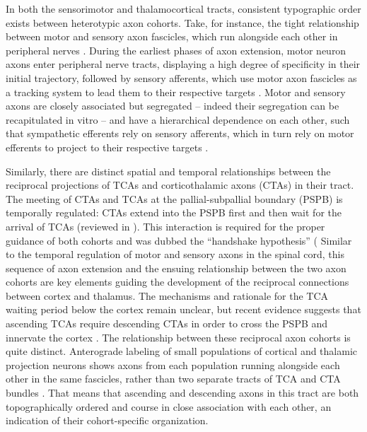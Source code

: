 In both the sensorimotor and thalamocortical tracts, consistent typographic order exists between heterotypic axon cohorts.
Take, for instance, the tight relationship between motor and sensory axon fascicles, which run alongside each other in peripheral nerves \cite{honig1998spatial}. 
During the earliest phases of axon extension, motor neuron axons enter peripheral nerve tracts, displaying a high degree of specificity in their initial trajectory, followed by sensory afferents, which use motor axon fascicles as a tracking system to lead them to their respective targets \cite{huettl2011npn,landmesser1986altered,wang2013axons,wang2014conserved}.
Motor and sensory axons are closely associated but segregated – indeed their segregation can be recapitulated in vitro \cite{gallarda2008segregation} – and have a hierarchical dependence on each other, such that sympathetic efferents rely on sensory afferents, which in turn rely on motor efferents to project to their respective targets \cite{wang2014conserved}.

Similarly, there are distinct spatial and temporal relationships between the reciprocal projections of TCAs and corticothalamic axons (CTAs) in their tract.
The meeting of CTAs and TCAs at the pallial-subpallial boundary (PSPB) is temporally regulated: CTAs extend into the PSPB first and then wait for the arrival of TCAs (reviewed in \cite{leyva2013and}). 
This interaction is required for the proper guidance of both cohorts and was dubbed the “handshake hypothesis” (\cite{molnar1995thalamic}
Similar to the temporal regulation of motor and sensory axons in the spinal cord, this sequence of axon extension and the ensuing relationship between the two axon cohorts are key elements guiding the development of the reciprocal connections between cortex and thalamus. 
The mechanisms and rationale for the TCA waiting period below the cortex remain unclear, but recent evidence suggests that ascending TCAs require descending CTAs in order to cross the PSPB and innervate the cortex \cite{chen2012evidence}.
The relationship between these reciprocal axon cohorts is quite distinct.
Anterograde labeling of small populations of cortical and thalamic projection neurons shows axons from each population running alongside each other in the same fascicles, rather than two separate tracts of TCA and CTA bundles \cite{molnar1998mechanisms}. 
That means that ascending and descending axons in this tract are both topographically ordered and course in close association with each other, an indication of their cohort-specific organization. %